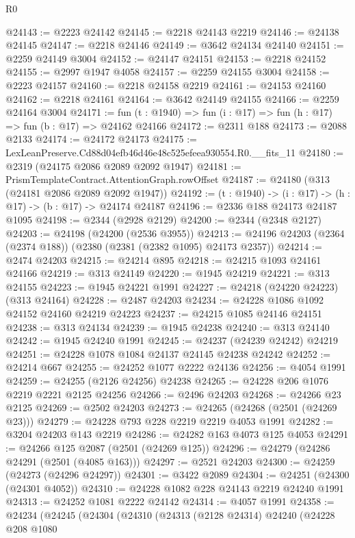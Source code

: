 \begin{lexlean}{R0}
\begin{coremodule}
@24143 := @2223 @24142
@24145 := @2218 @24143 @2219
@24146 := @24138 @24145
@24147 := @2218 @24146
@24149 := @3642 @24134 @24140
@24151 := @2259 @24149 @3004
@24152 := @24147 @24151
@24153 := @2218 @24152
@24155 := @2997 @1947 @4058
@24157 := @2259 @24155 @3004
@24158 := @2223 @24157
@24160 := @2218 @24158 @2219
@24161 := @24153 @24160
@24162 := @2218 @24161
@24164 := @3642 @24149 @24155
@24166 := @2259 @24164 @3004
@24171 := fun (t : @1940) => fun (i : @17) => fun (h : @17) => fun (b : @17) => @24162 @24166
@24172 := @2311 @188
@24173 := @2088 @2133
@24174 := @24172 @24173
@24175 := LexLeanPreserve.Cd88d04efb46d46e48c525efeea930554.R0.__fits_11
@24180 := @2319 (@24175 @2086 @2089 @2092 @1947)
@24181 := PrismTemplateContract.AttentionGraph.rowOffset
@24187 := @24180 (@313 (@24181 @2086 @2089 @2092 @1947))
@24192 := (t : @1940) -> (i : @17) -> (h : @17) -> (b : @17) -> @24174 @24187
@24196 := @2336 @188 @24173 @24187 @1095
@24198 := @2344 (@2928 @2129)
@24200 := @2344 (@2348 @2127)
@24203 := @24198 (@24200 (@2536 @3955))
@24213 := @24196 @24203 (@2364 (@2374 @188)) (@2380 (@2381 (@2382 @1095) @24173 @2357))
@24214 := @2474 @24203
@24215 := @24214 @895
@24218 := @24215 @1093 @24161 @24166
@24219 := @313 @24149
@24220 := @1945 @24219
@24221 := @313 @24155
@24223 := @1945 @24221 @1991
@24227 := @24218 (@24220 @24223) (@313 @24164)
@24228 := @2487 @24203
@24234 := @24228 @1086 @1092 @24152 @24160 @24219 @24223
@24237 := @24215 @1085 @24146 @24151
@24238 := @313 @24134
@24239 := @1945 @24238
@24240 := @313 @24140
@24242 := @1945 @24240 @1991
@24245 := @24237 (@24239 @24242) @24219
@24251 := @24228 @1078 @1084 @24137 @24145 @24238 @24242
@24252 := @24214 @667
@24255 := @24252 @1077 @2222 @24136
@24256 := @4054 @1991
@24259 := @24255 (@2126 @24256) @24238
@24265 := @24228 @206 @1076 @2219 @2221 @2125 @24256
@24266 := @2496 @24203
@24268 := @24266 @23 @2125
@24269 := @2502 @24203
@24273 := @24265 (@24268 (@2501 (@24269 @23)))
@24279 := @24228 @793 @228 @2219 @2219 @4053 @1991
@24282 := @3204 @24203 @143 @2219
@24286 := @24282 @163 @4073 @125 @4053
@24291 := @24266 @125 @2087 (@2501 (@24269 @125))
@24296 := @24279 (@24286 @24291 (@2501 (@4085 @163)))
@24297 := @2521 @24203
@24300 := @24259 (@24273 (@24296 @24297))
@24301 := @3422 @2089
@24304 := @24251 (@24300 (@24301 @4052))
@24310 := @24228 @1082 @228 @24143 @2219 @24240 @1991
@24313 := @24252 @1081 @2222 @24142
@24314 := @4057 @1991
@24358 := @24234
    (@24245
      (@24304
        (@24310
          (@24313
            (@2128 @24314)
            @24240
            (@24228
              @208
              @1080

\end{coremodule}
\end{lexlean}

